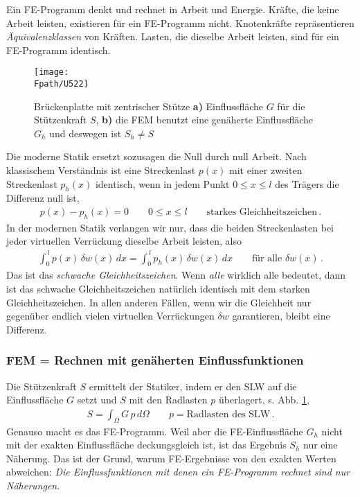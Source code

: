 Ein FE-Programm denkt und rechnet in Arbeit und Energie. Kr\"{a}fte, die keine Arbeit leisten, existieren f\"{u}r ein FE-Programm nicht. Knotenkr\"{a}fte repr\"{a}sentieren {\em \"{A}quivalenzklassen\/} von Kr\"{a}ften. Lasten, die dieselbe Arbeit leisten, sind f\"{u}r ein FE-Programm identisch.
\begin{figure}[tbp] \centering
\if {} \sidecaption \fi
\texttt{[image: \\Fpath/U522]}
\caption{Br\"{u}ckenplatte mit zentrischer St\"{u}tze \textbf{ a)} Einflussfl\"{a}che $G$ f\"{u}r die St\"{u}tzenkraft $S$, \textbf{ b)} die FEM benutzt eine gen\"{a}herte Einflussfl\"{a}che $G_h$ und deswegen ist $S_h \neq S$} \label{U522}
\end{figure}%

Die moderne Statik ersetzt sozusagen die Null durch null Arbeit. Nach klassischem Verst\"{a}ndnis ist eine Streckenlast $p(x)$ mit einer zweiten Streckenlast $p_h(x)$ identisch, wenn in jedem Punkt $0 \leq x \leq l$ des Tr\"{a}gers die Differenz null ist,
\begin{align}
p(x) - p_h(x) = 0 \qquad 0 \leq x \leq l \qquad \mbox{starkes Gleichheitszeichen}\,.
\end{align}
In der modernen Statik verlangen wir nur, dass die beiden Streckenlasten bei jeder virtuellen Verr\"{u}ckung
dieselbe Arbeit leisten, also
\begin{align}
\int_0^{\,l} p(x) \,\delta w(x)\,dx = \int_0^{\,l} p_h(x) \,\delta w(x)\,dx   \qquad
\mbox{f\"{u}r alle $\delta w(x)$}\,.
\end{align}
Das ist das {\em schwache Gleichheitszeichen\/}. Wenn {\em alle\/} wirklich alle bedeutet, dann ist das schwache Gleichheitszeichen nat\"{u}rlich identisch mit dem starken Gleichheitszeichen. In allen anderen F\"{a}llen, wenn wir die Gleichheit nur gegen\"{u}ber endlich vielen virtuellen Verr\"{u}ckungen $\delta w$ garantieren, bleibt eine Differenz.\\

{\textcolor{sectionTitleBlue}{\subsubsection*{FEM = Rechnen mit gen\"{a}herten Einflussfunktionen}}}

Die St\"{u}tzenkraft $S$ ermittelt der Statiker, indem er den SLW auf die Einflussfl\"{a}che $G$ setzt und  $S$ mit den Radlasten $p$ \"{u}berlagert, s. Abb. \ref{U522},
\begin{align}\label{Eq2}
S = \int_{\Omega} G\,p\,d\Omega \qquad p = \text{Radlasten des SLW}\,.
\end{align}
Genauso macht es das FE-Programm. Weil aber die FE-Einflussfl\"{a}che $G_h$ nicht mit der exakten Einflussfl\"{a}che deckungsgleich ist, ist das Ergebnis $S_h$ nur eine N\"{a}herung. Das ist der Grund, warum FE-Ergebnisse von den exakten Werten abweichen: {\em Die Einflussfunktionen mit denen ein FE-Programm rechnet sind nur N\"{a}herungen\/}.

